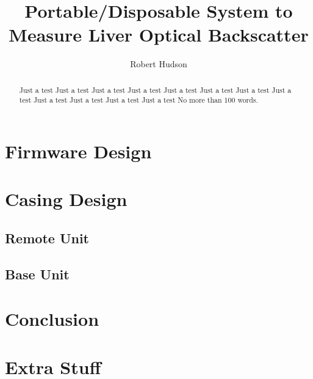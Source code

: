 \documentclass[draft]{IIBproject}
\begin{document}
\author{Robert Hudson}
\title{Portable/Disposable System to Measure Liver Optical Backscatter}
\maketitle
\thispagestyle{empty}


\begin{abstract}
Just a test Just a test Just a test Just a test Just a test Just a test 
Just a test Just a test Just a test Just a test Just a test Just a test 
No more than 100 words.
\end{abstract}

\newpage
\tableofcontents
\newpage
\pagestyle{plain}















\section{Firmware Design}

\section{Casing Design}

\subsection{Remote Unit}

\subsection{Base Unit}

\section{Conclusion}



\newpage




\appendix

\section{Extra Stuff}
\end{document}
